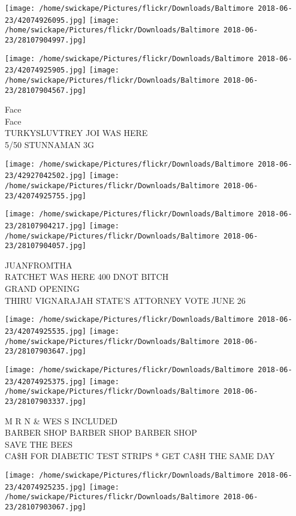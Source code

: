 \documentclass[10pt,letterpaper]{article}
\begin{document}
\texttt{[image: /home/swickape/Pictures/flickr/Downloads/Baltimore 2018-06-23/42074926095.jpg]}
\texttt{[image: /home/swickape/Pictures/flickr/Downloads/Baltimore 2018-06-23/28107904997.jpg]}

\texttt{[image: /home/swickape/Pictures/flickr/Downloads/Baltimore 2018-06-23/42074925905.jpg]}
\texttt{[image: /home/swickape/Pictures/flickr/Downloads/Baltimore 2018-06-23/28107904567.jpg]}

Face\\
Face\\
TURKYSLUVTREY JOI WAS HERE\\
5/50 STUNNAMAN 3G\\
\pagebreak

\texttt{[image: /home/swickape/Pictures/flickr/Downloads/Baltimore 2018-06-23/42927042502.jpg]}
\texttt{[image: /home/swickape/Pictures/flickr/Downloads/Baltimore 2018-06-23/42074925755.jpg]}

\texttt{[image: /home/swickape/Pictures/flickr/Downloads/Baltimore 2018-06-23/28107904217.jpg]}
\texttt{[image: /home/swickape/Pictures/flickr/Downloads/Baltimore 2018-06-23/28107904057.jpg]}

JUANFROMTHA\\
RATCHET WAS HERE 400 DNOT BITCH\\
GRAND OPENING\\
THIRU VIGNARAJAH STATE'S ATTORNEY VOTE JUNE 26\\
\pagebreak

\texttt{[image: /home/swickape/Pictures/flickr/Downloads/Baltimore 2018-06-23/42074925535.jpg]}
\texttt{[image: /home/swickape/Pictures/flickr/Downloads/Baltimore 2018-06-23/28107903647.jpg]}

\texttt{[image: /home/swickape/Pictures/flickr/Downloads/Baltimore 2018-06-23/42074925375.jpg]}
\texttt{[image: /home/swickape/Pictures/flickr/Downloads/Baltimore 2018-06-23/28107903337.jpg]}

M R N \& WES S INCLUDED\\
BARBER SHOP BARBER SHOP BARBER SHOP\\
SAVE THE BEES\\
CA\$H FOR DIABETIC TEST STRIPS * GET CA\$H THE SAME DAY\\
\pagebreak

\texttt{[image: /home/swickape/Pictures/flickr/Downloads/Baltimore 2018-06-23/42074925235.jpg]}
\texttt{[image: /home/swickape/Pictures/flickr/Downloads/Baltimore 2018-06-23/28107903067.jpg]}
\end{document}
